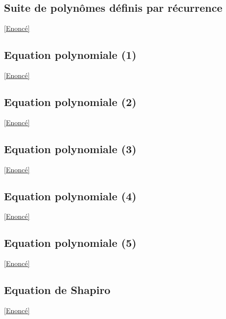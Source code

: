 \documentclass{book}
\begin{document}
	\subsection{Suite de polynômes définis par récurrence}
	\label{sec:suite-de-polynomes-definis-par-recurrence}
	\textcolor{blue}{\hyperref[Suite de polynômes définis par récurrence]{[Enoncé]}}\\
	
	\subsection{Equation polynomiale (1)}
	\label{sec:équation-polynomiale-(1)}
	\textcolor{blue}{\hyperref[Equation polynomiale (1)]{[Enoncé]}}\\
	
	\subsection{Equation polynomiale (2)}
	\label{sec:équation-polynomiale-(2)}
	\textcolor{blue}{\hyperref[Equation polynomiale (1)]{[Enoncé]}}\\
	
	\subsection{Equation polynomiale (3)}
	\label{sec:équation-polynomiale-(3)}
	\textcolor{blue}{\hyperref[Equation polynomiale (3)]{[Enoncé]}}\\
	
	\subsection{Equation polynomiale (4)}
	\label{sec:équation-polynomiale-(4)}
	\textcolor{blue}{\hyperref[Equation polynomiale (4)]{[Enoncé]}}\\
	
	\subsection{Equation polynomiale (5)}
	\label{sec:équation-polynomiale-(5)}
	\textcolor{blue}{\hyperref[Equation polynomiale (5)]{[Enoncé]}}\\
	
	\subsection{Equation de Shapiro}
	\label{sec:équation-de-shapiro}
	\textcolor{blue}{\hyperref[Equation de Shapiro]{[Enoncé]}}\\
	
\end{document}
